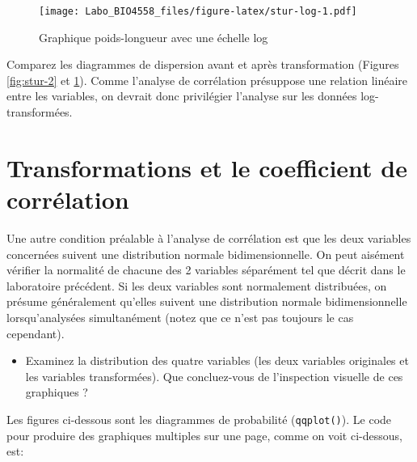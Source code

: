 \documentclass[
  12pt,
]{book}
\providecommand{\tightlist}{%
  \setlength{\itemsep}{0pt}\setlength{\parskip}{0pt}}
\begin{document}
\begin{figure}
\centering
\texttt{[image: Labo\_BIO4558\_files/figure-latex/stur-log-1.pdf]}
\caption{\label{fig:stur-log}Graphique poids-longueur avec une échelle log}
\end{figure}

Comparez les diagrammes de dispersion avant et après transformation (Figures \ref{fig:stur-2} et \ref{fig:stur-log}). Comme l'analyse de corrélation présuppose une relation linéaire entre les variables, on devrait donc privilégier l'analyse sur les données log-transformées.

\hypertarget{transformations-et-le-coefficient-de-corruxe9lation}{%
\section{Transformations et le coefficient de corrélation}\label{transformations-et-le-coefficient-de-corruxe9lation}}

Une autre condition préalable à l'analyse de corrélation est que les deux variables concernées suivent une distribution normale bidimensionnelle.
On peut aisément vérifier la normalité de chacune des 2 variables séparément tel que décrit dans le laboratoire précédent.
Si les deux variables sont normalement distribuées, on présume généralement qu'elles suivent une distribution normale bidimensionnelle lorsqu'analysées simultanément (notez que ce n'est pas toujours le cas cependant).

\begin{itemize}
\tightlist
\item
  Examinez la distribution des quatre variables (les deux variables originales et les variables transformées). Que concluez-vous de l'inspection visuelle de ces graphiques ?
\end{itemize}

Les figures ci-dessous sont les diagrammes de probabilité (\texttt{qqplot()}).
Le code pour produire des graphiques multiples sur une page, comme
on voit ci-dessous, est:
\end{document}
